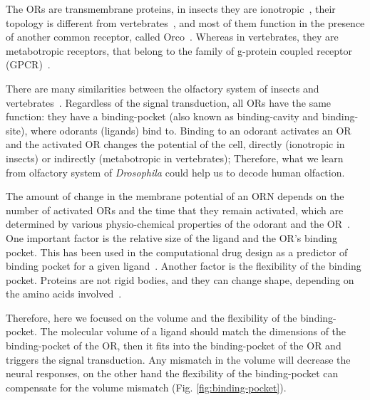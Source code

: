 \documentclass[fleqn,11pt]{wlscirep}
\begin{document}
The ORs are transmembrane proteins, 
in insects they are ionotropic~\cite{Sato2008,Wicher2008,Nagel2011,Rong2011}, 
their topology is different from vertebrates~\cite{Benton2006,Smart2008},
and most of them function in the presence of another common receptor, called Orco~\cite{Larsson2004}.
Whereas in vertebrates, they are metabotropic receptors, that belong to the family of g-protein coupled receptor (GPCR)~\cite{Buck1991,niimura2009evolutionary}. 

There are many similarities between the olfactory system of insects and vertebrates~\cite{Wilson2014,Kaupp2010}.
Regardless of the signal transduction, 
all ORs have the same function: they have a binding-pocket (also known as binding-cavity and binding-site),
where odorants (ligands) bind to. 
Binding to an odorant activates an OR and 
the activated OR changes the potential of the cell, 
directly (ionotropic in insects) or indirectly (metabotropic in vertebrates);
Therefore, what we learn from olfactory system of \textit{Drosophila} could help us to decode human olfaction. 


The amount of change in the membrane potential of an ORN depends on the number of activated ORs and the time that they remain activated,
which are determined by various physio-chemical properties of the odorant and the OR~\cite{Turin,Araneda2000,Gabler2013,guerrieri2005,uchida2000}.
One important factor is the relative size of the ligand and the OR's binding pocket. 
This has been used in the computational drug design as a predictor of binding pocket for a given ligand~\cite{liang1998anatomy}. 
Another factor is the flexibility of the binding pocket. 
Proteins are not rigid bodies,  
and they can change shape, 
depending on the amino acids involved~\cite{Ramachandran,apostolakis1998docking,gunasekaran2007different}.

Therefore, here we focused on the volume and the flexibility of the binding-pocket.
The molecular volume of a ligand should match the dimensions of the binding-pocket of the OR,
then it fits into the binding-pocket of the OR and triggers the signal transduction. 
Any mismatch in the volume will decrease the neural responses, 
on the other hand the flexibility of the binding-pocket can compensate for the volume mismatch (Fig. \ref{fig:binding-pocket}).
\end{document}

